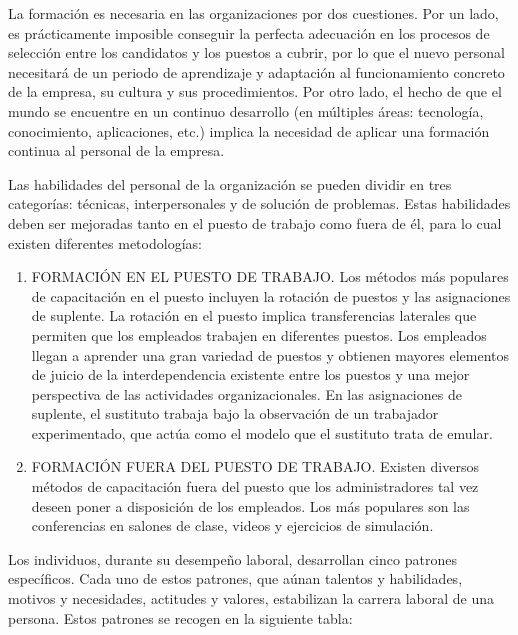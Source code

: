 \documentclass[
]{krantz}
\providecommand{\tightlist}{%
  \setlength{\itemsep}{0pt}\setlength{\parskip}{0pt}}
\begin{document}
La formación es necesaria en las organizaciones por dos cuestiones. Por un lado, es prácticamente imposible conseguir la perfecta adecuación en los procesos de selección entre los candidatos y los puestos a cubrir, por lo que el nuevo personal necesitará de un periodo de aprendizaje y adaptación al funcionamiento concreto de la empresa, su cultura y sus procedimientos. Por otro lado, el hecho de que el mundo se encuentre en un continuo desarrollo (en múltiples áreas: tecnología, conocimiento, aplicaciones, etc.) implica la necesidad de aplicar una formación continua al personal de la empresa.

Las habilidades del personal de la organización se pueden dividir en tres categorías: técnicas, interpersonales y de solución de problemas. Estas habilidades deben ser mejoradas tanto en el puesto de trabajo como fuera de él, para lo cual existen diferentes metodologías:

\begin{enumerate}
\def\labelenumi{\arabic{enumi}.}
\tightlist
\item
  FORMACIÓN EN EL PUESTO DE TRABAJO. Los métodos más populares de capacitación en el puesto incluyen la rotación de puestos y las asignaciones de suplente. La rotación en el puesto implica transferencias laterales que permiten que los empleados trabajen en diferentes puestos. Los empleados llegan a aprender una gran variedad de puestos y obtienen mayores elementos de juicio de la interdependencia existente entre los puestos y una mejor perspectiva de las actividades organizacionales. En las asignaciones de suplente, el sustituto trabaja bajo la observación de un trabajador experimentado, que actúa como el modelo que el sustituto trata de emular.
\item
  FORMACIÓN FUERA DEL PUESTO DE TRABAJO. Existen diversos métodos de capacitación fuera del puesto que los administradores tal vez deseen poner a disposición de los empleados. Los más populares son las conferencias en salones de clase, videos y ejercicios de simulación.
\end{enumerate}

Los individuos, durante su desempeño laboral, desarrollan cinco patrones específicos. Cada uno de estos patrones, que aúnan talentos y habilidades, motivos y necesidades, actitudes y valores, estabilizan la carrera laboral de una persona. Estos patrones se recogen en la siguiente tabla:
\end{document}
